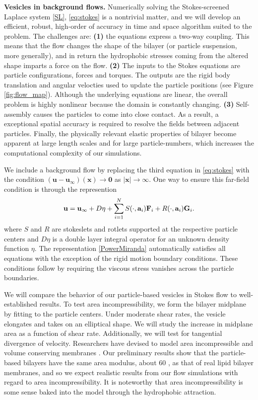 \textbf{Vesicles in background flows.}
Numerically solving the Stokes-screened Laplace system \eqref{SL}, \eqref{eq:stokes} is a nontrivial matter,
and we will develop an efficient, robust, high-order of accuracy in time and space algorithm suited to the problem. 
The challenges are: \textbf{(1)} the equations express a two-way coupling.
This means that the flow changes the shape of the bilayer (or particle suspension, more generally),
and in return the hydrophobic stresses coming from the altered shape imparts a force on the flow. 
\textbf{(2)}
The inputs to the Stokes equations are particle configurations, forces and torques. 
The outputs are the rigid body translation and angular velocties used to update the particle positions (see Figure \ref{fig:flow_map}).
Although the underlying equations are linear, the overall problem is highly nonlinear because the domain is constantly changing.
\textbf{(3)} Self-assembly causes the particles to come into close contact.  
As a result, a exceptional spatial accuracy is required to resolve the fields between adjacent particles.
Finally, the physically relevant elastic properties of bilayer become apparent at large length scales and for large particle-numbers,
which increases the computational complexity of our simulations. 

We include a background flow by replacing the third equation in \eqref{eq:stokes} with the condition
$(\mathbf{u} - \mathbf{u}_{\infty})(\mathbf{x}) \to \mathbf{0}$ as $|\mathbf{x}| \to \infty.$ 
One way to ensure this far-field condition is through the represention 
\begin{equation}
\label{PowerMiranda}
{\bf u} = {\bf u}_{\infty} + D\eta + \sum_{i=1}^N S(\cdot, {\bf a}_i) {\bf F}_i + R(\cdot, {\bf a}_i) {\bf G}_i.
\end{equation}
where $S$ and $R$ are stokeslets and rotlets supported at the respective particle centers 
and $D\eta$ is a double layer integral operator for an unknown density function $\eta.$ 
The representation \eqref{PowerMiranda} automatically satisfies all equations with the exception of the rigid motion boundary conditions. 
These conditions follow by requiring the viscous stress vanishes across the particle boundaries.

We will compare the behavior of our particle-based vesicles in Stokes flow to well-established results.
To test area incompressibility, we form the bilayer midplane by fitting to the particle centers. Under moderate shear rates,
the vesicle elongates and takes on an elliptical shape. We will study the increase in midplane area as a function of shear rate.
Additionally, we will test for tangential divergence of velocity.
Researchers have devised to model area incompressible and
volume conserving membranes
\cite{torres-sanchez_millan_arroyo_2019, mahapatra_saintillan_rangamani_2020, Steigmann99, C6SM02452A}.
Our preliminary results show that the particle-based bilayers have the same area modulus, about 60 \kBT,  as that of real lipid bilayer membranes,
and so we expect realistic results from our flow simulations with regard to area incompressibility.  It is noteworthy that
area incompressibility is some sense baked into the model through the hydrophobic attraction. 

